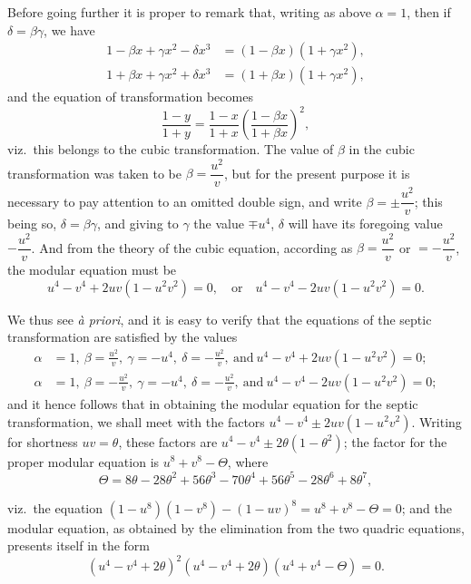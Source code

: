 \documentclass[11pt]{article}
\begin{document}
Before going further it is proper to remark that, writing as above $\alpha = 1$, then if $\delta = \beta\gamma$, we have
\begin{align*}
1 - \beta x + \gamma x^{2} - \delta x^{3} &= (1 - \beta x)(1 + \gamma x^{2}),\\
1 + \beta x + \gamma x^{2} + \delta x^{3} &= (1 + \beta x)(1 + \gamma x^{2}),
\end{align*}
and the equation of transformation becomes
\[
\frac{1 - y}{1 + y} = \frac{1 - x}{1 + x}\left(\frac{1 - \beta x}{1 + \beta x}\right)^{2},
\]
viz.\ this belongs to the cubic transformation. The value of $\beta$ in the cubic transformation was taken to be $\beta = \dfrac{u^{2}}{v}$, but for the present purpose it is necessary to pay attention to an omitted double sign, and write $\beta = \pm\dfrac{u^{2}}{v}$; this being so, $\delta = \beta\gamma$, and giving to $\gamma$ the value $\mp u^{4}$, $\delta$ will have its foregoing value $-\dfrac{u^{2}}{v}$. And from the theory of the cubic equation, according as $\beta = \dfrac{u^{2}}{v}$ or $= -\dfrac{u^{2}}{v}$, the modular equation must be
\[
u^{4} - v^{4} + 2uv(1 - u^{2}v^{2}) = 0, \quad \text{or} \quad u^{4} - v^{4} - 2uv(1 - u^{2}v^{2}) = 0.
\]

We thus see \textit{\`a priori}, and it is easy to verify that the equations of the septic transformation are satisfied by the values
\begin{align*}
\alpha &= 1,\ \beta = \frac{u^{2}}{v},\ \gamma = -u^{4},\ \delta = -\frac{u^{2}}{v},\ \text{and}\ u^{4} - v^{4} + 2uv(1 - u^{2}v^{2}) = 0;\\
\alpha &= 1,\ \beta = -\frac{u^{2}}{v},\ \gamma = -u^{4},\ \delta = -\frac{u^{2}}{v},\ \text{and}\ u^{4} - v^{4} - 2uv(1 - u^{2}v^{2}) = 0;
\end{align*}
and it hence follows that in obtaining the modular equation for the septic transformation, we shall meet with the factors $u^{4} - v^{4} \pm 2uv(1 - u^{2}v^{2})$. Writing for shortness $uv = \theta$, these factors are $u^{4} - v^{4} \pm 2\theta(1 - \theta^{2})$; the factor for the proper modular equation is $u^{8} + v^{8} - \Theta$, where
\[
\Theta = 8\theta - 28\theta^{2} + 56\theta^{3} - 70\theta^{4} + 56\theta^{5} - 28\theta^{6} + 8\theta^{7},
\]


\noindent viz.\ the equation $(1 - u^{8})(1 - v^{8}) - (1 - uv)^{8} = u^{8} + v^{8} - \Theta = 0$; and the modular equation, as obtained by the elimination from the two quadric equations, presents itself in the form
\[
(u^{4} - v^{4} + 2\theta)^{2}(u^{4} - v^{4} + 2\theta)(u^{4} + v^{4} - \Theta) = 0.
\]
\end{document}
